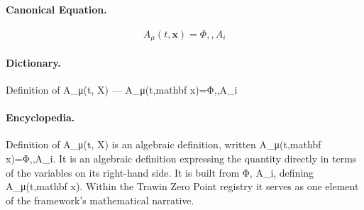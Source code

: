 \paragraph{Canonical Equation.}
\[
A_\mu(t,\mathbf x)={\Phi,,A_i}
\]

\paragraph{Dictionary.}
Definition of A\_μ(t, X) — A\_μ(t,mathbf x)=Φ,,A\_i

\paragraph{Encyclopedia.}
Definition of A\_μ(t, X) is an algebraic definition, written A\_μ(t,mathbf x)=Φ,,A\_i. It is an algebraic definition expressing the quantity directly in terms of the variables on its right-hand side. It is built from Φ, A\_i, defining A\_μ(t,mathbf x). Within the Trawin Zero Point registry it serves as one element of the framework's mathematical narrative.
